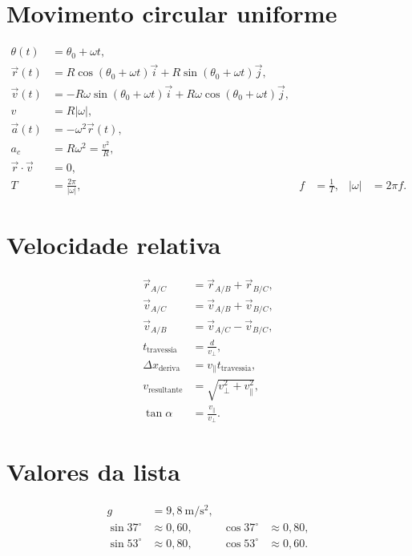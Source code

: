 \documentclass[12pt,a4paper]{article}
\newcommand{\vi}{\vec{i}}
\newcommand{\vj}{\vec{j}}
\begin{document}
\section*{Movimento circular uniforme}
\begin{align*}
\theta(t)&=\theta_0+\omega t,\\
\vec r(t)&=R\cos(\theta_0+\omega t)\vi
+R\sin(\theta_0+\omega t)\vj,\\
\vec v(t)&=-R\omega\sin(\theta_0+\omega t)\vi
+R\omega\cos(\theta_0+\omega t)\vj,\\
v&=R|\omega|,\\
\vec a(t)&=-\omega^2\vec r(t),\\
a_c&=R\omega^2=\frac{v^2}{R},\\
\vec r\cdot\vec v&=0,\\
T&=\frac{2\pi}{|\omega|}, & f&=\frac1T, & |\omega|&=2\pi f.
\end{align*}

\section*{Velocidade relativa}
\begin{align*}
\vec r_{A/C}&=\vec r_{A/B}+\vec r_{B/C},\\
\vec v_{A/C}&=\vec v_{A/B}+\vec v_{B/C},\\
\vec v_{A/B}&=\vec v_{A/C}-\vec v_{B/C},\\
t_{\mathrm{travessia}}&=\frac{d}{v_{\perp}},\\
\Delta x_{\mathrm{deriva}}&=v_{\parallel}t_{\mathrm{travessia}},\\
v_{\mathrm{resultante}}&=\sqrt{v_{\perp}^{2}+v_{\parallel}^{2}},\\
\tan\alpha&=\frac{v_{\parallel}}{v_{\perp}}.
\end{align*}

\section*{Valores da lista}
\begin{align*}
g&=9{,}8\ \mathrm{m/s^2},\\
\sin37^\circ&\approx0{,}60, & \cos37^\circ&\approx0{,}80,\\
\sin53^\circ&\approx0{,}80, & \cos53^\circ&\approx0{,}60.
\end{align*}
\end{document}
